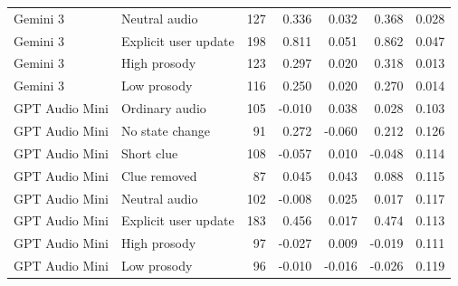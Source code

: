 \begin{table}[htbp]
\begin{tabular}{@{}llrrrrr@{}}
    Gemini 3 & Neutral audio & 127 & 0.336 & 0.032 & 0.368 & 0.028 \\
    Gemini 3 & Explicit user update & 198 & 0.811 & 0.051 & 0.862 & 0.047 \\
    Gemini 3 & High prosody & 123 & 0.297 & 0.020 & 0.318 & 0.013 \\
    Gemini 3 & Low prosody & 116 & 0.250 & 0.020 & 0.270 & 0.014 \\
    \addlinespace
    GPT Audio Mini & Ordinary audio & 105 & -0.010 & 0.038 & 0.028 & 0.103 \\
    GPT Audio Mini & No state change & 91 & 0.272 & -0.060 & 0.212 & 0.126 \\
    GPT Audio Mini & Short clue & 108 & -0.057 & 0.010 & -0.048 & 0.114 \\
    GPT Audio Mini & Clue removed & 87 & 0.045 & 0.043 & 0.088 & 0.115 \\
    GPT Audio Mini & Neutral audio & 102 & -0.008 & 0.025 & 0.017 & 0.117 \\
    GPT Audio Mini & Explicit user update & 183 & 0.456 & 0.017 & 0.474 & 0.113 \\
    GPT Audio Mini & High prosody & 97 & -0.027 & 0.009 & -0.019 & 0.111 \\
    GPT Audio Mini & Low prosody & 96 & -0.010 & -0.016 & -0.026 & 0.119 \\
    \bottomrule
  \end{tabular}
\end{table}
